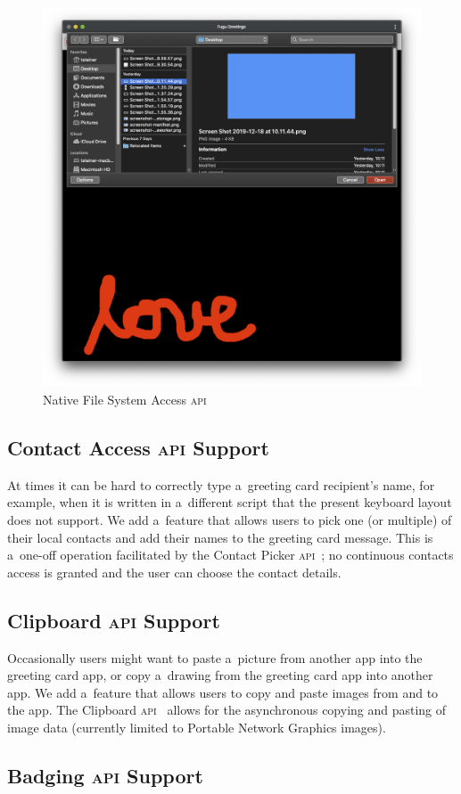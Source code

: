 \documentclass[sigconf]{acmart}
\begin{document}
\begin{figure}[b]
  \includegraphics[width=0.5\columnwidth]{file.png}
  \caption{Native File System Access \textsc{api}}
  \label{fig:file}
\end{figure}

\subsection{Contact Access \textsc{api} Support}

At times it can be hard to correctly type a~greeting card recipient's name,
for example, when it is written in a~different script
that the present keyboard layout does not support.
We add a~feature that allows users to pick one (or multiple) of their local contacts
and add their names to the greeting card message.
This is a~one-off operation facilitated by the Contact Picker \textsc{api}~\cite{beverloo19};
no continuous contacts access is granted
and the user can choose the contact details.

\subsection{Clipboard \textsc{api} Support}

Occasionally users might want to paste a~picture from another app into the greeting card app,
or copy a~drawing from the greeting card app into another app.
We add a~feature that allows users to copy and paste images from and to the app.
The Clipboard \textsc{api}~\cite{kacmarcik19} allows for the asynchronous copying and pasting
of image data (currently limited to Portable Network Graphics images).

\subsection{Badging \textsc{api} Support}
\end{document}
